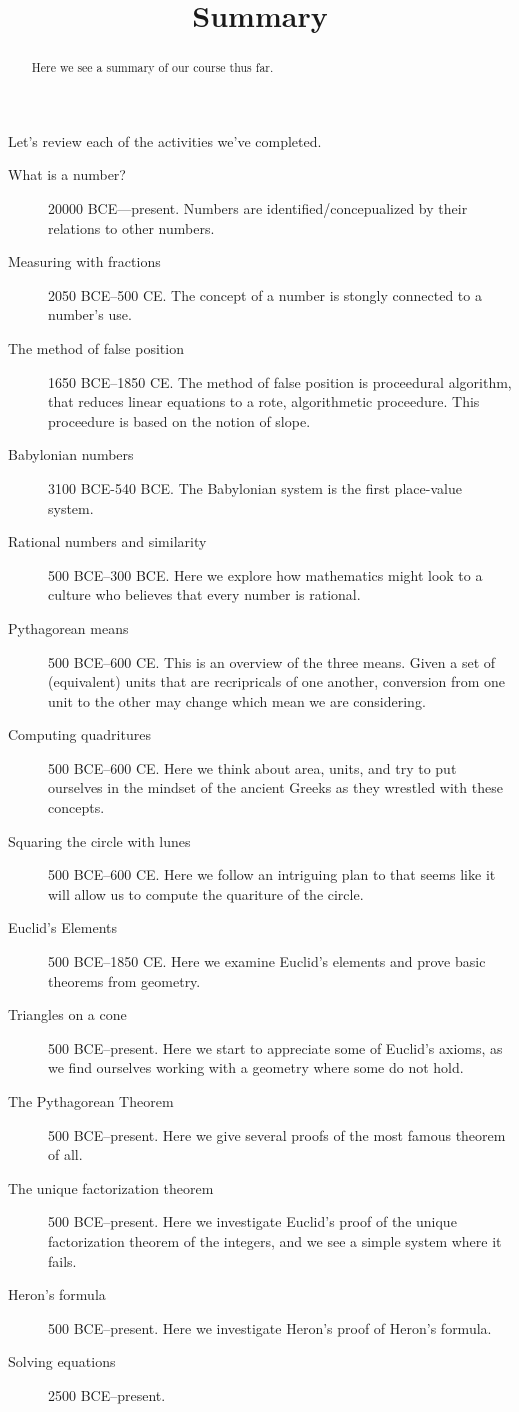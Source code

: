 \documentclass{ximera}
\title{Summary}
\begin{document}
\begin{abstract}
Here we see a summary of our course thus far. 
\end{abstract}
\maketitle

Let's review each of the activities we've completed.

\begin{description}
\item[What is a number?] 20000 BCE---present. Numbers are
  identified/concepualized by their relations to other numbers.
\item[Measuring with fractions] 2050 BCE--500
  CE. The concept of a number is stongly connected to
  a number's use. 
\item[The method of false position] 1650 BCE--1850
  CE. The method of false position is proceedural
  algorithm, that reduces linear equations to a rote, algorithmetic
  proceedure. This proceedure is based on the notion of slope.
\item[Babylonian numbers] 3100 BCE-540 BCE. The
  Babylonian system is the first place-value system.
\item[Rational numbers and similarity] 500
  BCE--300 BCE. Here we explore how mathematics might look to a
  culture who believes that every number is rational.
\item[Pythagorean means] 500 BCE--600 CE. This is an overview of the
  three means. Given a set of (equivalent) units that are recripricals
  of one another, conversion from one unit to the other may change
  which mean we are considering.
\item[Computing quadritures] 500 BCE--600 CE. Here we think about
  area, units, and try to put ourselves in the mindset of the ancient
  Greeks as they wrestled with these concepts.
\item[Squaring the circle with lunes] 500 BCE--600 CE. Here we follow
  an intriguing plan to that seems like it will allow us to compute
  the quariture of the circle.
\item[Euclid's Elements] 500 BCE--1850 CE. Here we examine Euclid's
  elements and prove basic theorems from geometry.
\item[Triangles on a cone] 500 BCE--present. Here we start to
  appreciate some of Euclid's axioms, as we find ourselves working
  with a geometry where some do not hold.
\item[The Pythagorean Theorem] 500 BCE--present. Here we give several
  proofs of the most famous theorem of all.
\item[The unique factorization theorem] 500 BCE--present. Here we
  investigate Euclid's proof of the unique factorization theorem of
  the integers, and we see a simple system where it fails.
\item[Heron's formula] 500 BCE--present. Here we investigate Heron's proof of Heron's formula.
\item[Solving equations] 2500 BCE--present.
\end{description}
\end{document}
